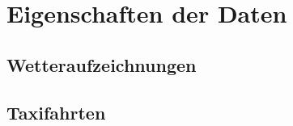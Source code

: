 \section{Eigenschaften der Daten}
\label{sec:Daten}


\subsection{Wetteraufzeichnungen}
\label{subsec:Wetterdaten}
\subsection{Taxifahrten}
\label{subsec:Taxidaten}
